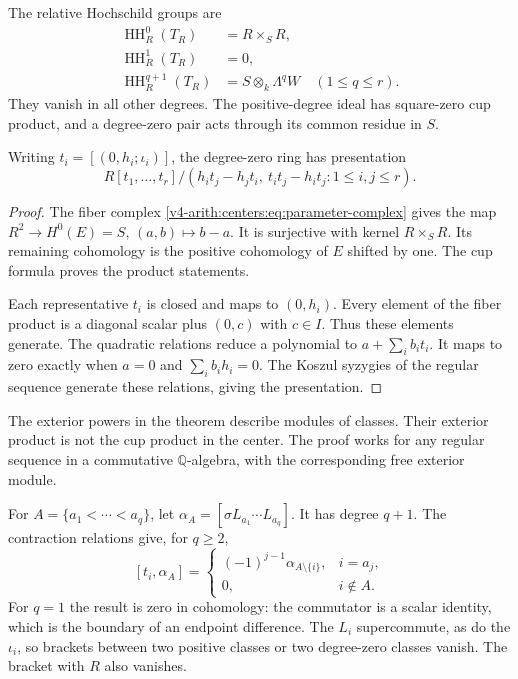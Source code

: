 \begin{theorem}\label{v4-arith:centers:thm:integral-parameter}
The relative Hochschild groups are
\[
\begin{split}
 \operatorname{HH}^0_R(T_R)&=R\times_S R,\\
 \operatorname{HH}^1_R(T_R)&=0,\\
 \operatorname{HH}^{q+1}_R(T_R)&=S\otimes_k\Lambda^qW
       \quad(1\leq q\leq r).
\end{split}
\]
They vanish in all other degrees. The
positive-degree ideal has square-zero cup
product, and a degree-zero pair acts through
its common residue in $S$.

Writing $t_i=[(0,h_i;\iota_i)]$, the
degree-zero ring has presentation
\[
 R[t_1,\ldots,t_r]/
 (h_it_j-h_jt_i,\ t_it_j-h_it_j:1\leq i,j\leq r).
\]
\end{theorem}

\begin{proof}
The fiber complex
\eqref{v4-arith:centers:eq:parameter-complex}
gives the map
$R^2\to H^0(E)=S$, $(a,b)\mapsto b-a$.
It is surjective with kernel $R\times_S R$.
Its remaining cohomology is the positive
cohomology of $E$ shifted by one.
The cup formula proves the product
statements.

Each representative $t_i$ is closed and
maps to $(0,h_i)$. Every element of the
fiber product is a diagonal scalar plus
$(0,c)$ with $c\in I$. Thus these elements
generate. The quadratic relations reduce
a polynomial to $a+\sum_i b_it_i$.
It maps to zero exactly when $a=0$ and
$\sum_i b_ih_i=0$. The Koszul syzygies
of the regular sequence generate these
relations, giving the presentation.
\end{proof}

The exterior powers in the theorem describe
modules of classes. Their exterior product
is not the cup product in the center.
The proof works for any regular sequence
in a commutative $\mathbb Q$-algebra, with
the corresponding free exterior module.

For $A=\{a_1<\cdots<a_q\}$, let
$\alpha_A=[\sigma L_{a_1}\cdots L_{a_q}]$.
It has degree $q+1$. The contraction
relations give, for $q\geq2$,
\begin{equation}\label{v4-arith:centers:eq:contraction-bracket}
 [t_i,\alpha_A]=
 \begin{cases}
 (-1)^{j-1}\alpha_{A\setminus\{i\}},&i=a_j,\\
 0,&i\notin A.
 \end{cases}
\end{equation}
For $q=1$ the result is zero in cohomology:
the commutator is a scalar identity, which
is the boundary of an endpoint difference.
The $L_i$ supercommute, as do the
$\iota_i$, so brackets between two positive
classes or two degree-zero classes vanish.
The bracket with $R$ also vanishes.

